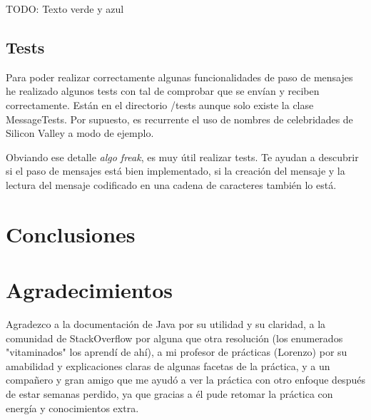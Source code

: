 \documentclass{article}
\begin{document}
TODO: Texto verde y azul

\subsection{Tests}

Para poder realizar correctamente algunas funcionalidades de paso de mensajes he realizado algunos tests con tal de comprobar que se envían y reciben correctamente. Están en el directorio /tests aunque solo existe la clase MessageTests. Por supuesto, es recurrente el uso de nombres de celebridades de Silicon Valley a modo de ejemplo.

Obviando ese detalle \textit{algo freak}, es muy útil realizar tests. Te ayudan a descubrir si el paso de mensajes está bien implementado, si la creación del mensaje y la lectura del mensaje codificado en una cadena de caracteres también lo está.

\section{Conclusiones}

\section{Agradecimientos}

Agradezco a la documentación de Java por su utilidad y su claridad, a la comunidad de StackOverflow por alguna que otra resolución (los enumerados "vitaminados" los aprendí de ahí), a mi profesor de prácticas (Lorenzo) por su amabilidad y explicaciones claras de algunas facetas de la práctica, y a un compañero y gran amigo que me ayudó a ver la práctica con otro enfoque después de estar semanas perdido, ya que gracias a él pude retomar la práctica con energía y conocimientos extra.
\end{document}
